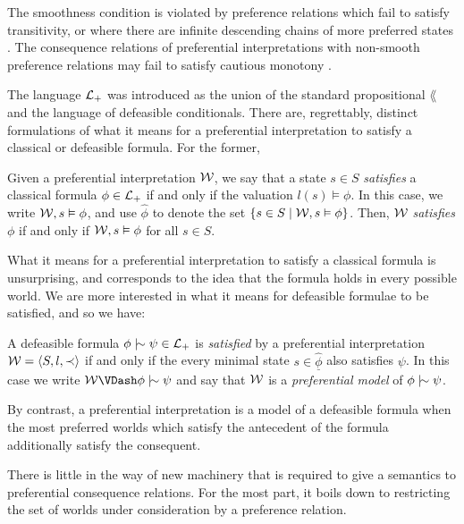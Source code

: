 The smoothness condition is violated by preference relations which fail to satisfy transitivity, or where there are
infinite descending chains of more preferred states \cite{Schlechta1996}. The consequence relations of preferential interpretations
with non-smooth preference relations may fail to satisfy cautious monotony \cite{kraus1990nonmonotonic,makinson2003bridges}.

The language $\mathcal{L}_+$ was introduced as the union of the standard propositional $\lang$ and the language of defeasible conditionals.
There are, regrettably, distinct formulations of what it means for a preferential interpretation to satisfy a classical
or defeasible formula. For the former,

\begin{definition}
	\label{definition:state-satisfaction}

	Given a preferential interpretation $\mathcal{W}$, we say that a state $s \in S$ \emph{satisfies} a classical formula
	$\phi \in \mathcal{L}_+$ if and only if the valuation $l(s) \vDash \phi$. In this case, we write $\mathcal{W}, s \vDash \phi$, and use
	$\hat{\phi}$ to denote the set $\{s \in S \mid \mathcal{W},s \vDash \phi \}$. Then, $\mathcal{W}$ \textit{satisfies} $\phi$ if and
	only if $\mathcal{W} , s \vDash \phi$ for all $s \in S$.
\end{definition}

What it means for a preferential interpretation to satisfy a classical formula is unsurprising, and corresponds to the idea
that the formula holds in every possible world. We are more interested in what it means for defeasible formulae to be
satisfied, and so we have:

\begin{definition}
	\label{definition:preferentially-satisfiable}

	A defeasible formula $\phi \twiddle \psi \in \Lang$ is \emph{satisfied} by a preferential interpretation $\mathcal{W} = \langle S,l,\prec \rangle$ if and
	only if the every minimal state $s \in \underline{\hat{\phi}}$ also satisfies $\psi$. In this case we write
	$\pin \VDash \phi \twiddle \psi$ and say that $\mathcal{W}$ is a \emph{preferential model} of $\phi \twiddle \psi$.
\end{definition}

By contrast, a preferential interpretation is a model of a defeasible formula when the most preferred worlds which satisfy
the antecedent of the formula additionally satisfy the consequent.

There is little in the way of new machinery that is required to give a semantics to preferential consequence relations.
For the most part, it boils down to restricting the set of worlds under consideration by a preference relation.

